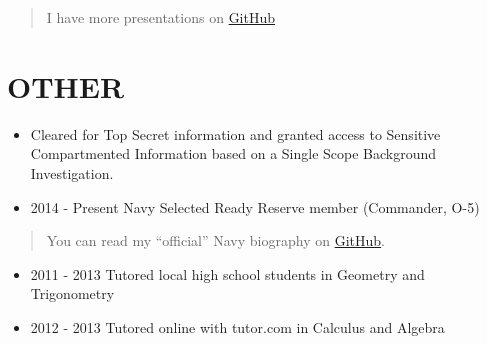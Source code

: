 \documentclass[10pt]{article}
\def\tightlist{}
\begin{document}
\begin{quote}
I have more presentations on \href{https://github.com/?q=slides}{GitHub}
\end{quote}

\hypertarget{other}{%
\section{OTHER}\label{other}}

\begin{itemize}
\tightlist
\item
  Cleared for Top Secret information and granted access to Sensitive
  Compartmented Information based on a Single Scope Background
  Investigation.
\item
  2014 - Present Navy Selected Ready Reserve member (Commander, O-5)
\end{itemize}

\begin{quote}
You can read my ``official'' Navy biography on
\href{https://github.com/jhwohlgemuth/navy-biography}{GitHub}.
\end{quote}

\begin{itemize}
\tightlist
\item
  2011 - 2013 Tutored local high school students in Geometry and
  Trigonometry
\item
  2012 - 2013 Tutored online with tutor.com in Calculus and Algebra
\end{itemize}

\end{document}
